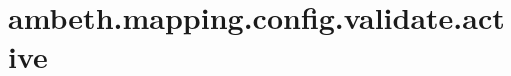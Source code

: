 \section{ambeth.mapping.config.validate.active}
\label{configuration:AmbethMappingConfigValidateActive}
\TODO
